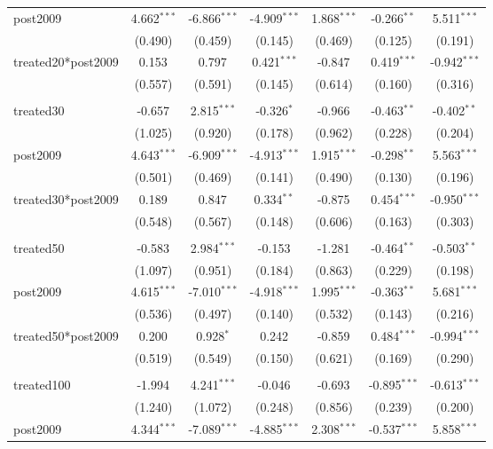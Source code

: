 \documentclass[12pt]{article}
\begin{document}
\begin{table}[!htbp]
\begin{tabular}{@{\extracolsep{5pt}}lcccccc}
 post2009 & 4.662$^{***}$ & -6.866$^{***}$ & -4.909$^{***}$ & 1.868$^{***}$ & -0.266$^{**}$ & 5.511$^{***}$ \\
  & (0.490) & (0.459) & (0.145) & (0.469) & (0.125) & (0.191) \\
 treated20*post2009 & 0.153$^{}$ & 0.797$^{}$ & 0.421$^{***}$ & -0.847$^{}$ & 0.419$^{***}$ & -0.942$^{***}$ \\
  & (0.557) & (0.591) & (0.145) & (0.614) & (0.160) & (0.316) \\
\hline \\[-1.8ex]
 treated30 & -0.657$^{}$ & 2.815$^{***}$ & -0.326$^{*}$ & -0.966$^{}$ & -0.463$^{**}$ & -0.402$^{**}$ \\
  & (1.025) & (0.920) & (0.178) & (0.962) & (0.228) & (0.204) \\
 post2009 & 4.643$^{***}$ & -6.909$^{***}$ & -4.913$^{***}$ & 1.915$^{***}$ & -0.298$^{**}$ & 5.563$^{***}$ \\
  & (0.501) & (0.469) & (0.141) & (0.490) & (0.130) & (0.196) \\
 treated30*post2009 & 0.189$^{}$ & 0.847$^{}$ & 0.334$^{**}$ & -0.875$^{}$ & 0.454$^{***}$ & -0.950$^{***}$ \\
  & (0.548) & (0.567) & (0.148) & (0.606) & (0.163) & (0.303) \\
\hline \\[-1.8ex]
 treated50 & -0.583$^{}$ & 2.984$^{***}$ & -0.153$^{}$ & -1.281$^{}$ & -0.464$^{**}$ & -0.503$^{**}$ \\
  & (1.097) & (0.951) & (0.184) & (0.863) & (0.229) & (0.198) \\
 post2009 & 4.615$^{***}$ & -7.010$^{***}$ & -4.918$^{***}$ & 1.995$^{***}$ & -0.363$^{**}$ & 5.681$^{***}$ \\
  & (0.536) & (0.497) & (0.140) & (0.532) & (0.143) & (0.216) \\
 treated50*post2009 & 0.200$^{}$ & 0.928$^{*}$ & 0.242$^{}$ & -0.859$^{}$ & 0.484$^{***}$ & -0.994$^{***}$ \\
  & (0.519) & (0.549) & (0.150) & (0.621) & (0.169) & (0.290) \\
\hline \\[-1.8ex]
 treated100 & -1.994$^{}$ & 4.241$^{***}$ & -0.046$^{}$ & -0.693$^{}$ & -0.895$^{***}$ & -0.613$^{***}$ \\
  & (1.240) & (1.072) & (0.248) & (0.856) & (0.239) & (0.200) \\
 post2009 & 4.344$^{***}$ & -7.089$^{***}$ & -4.885$^{***}$ & 2.308$^{***}$ & -0.537$^{***}$ & 5.858$^{***}$ \\

\end{tabular}
\end{table}
\end{document}
